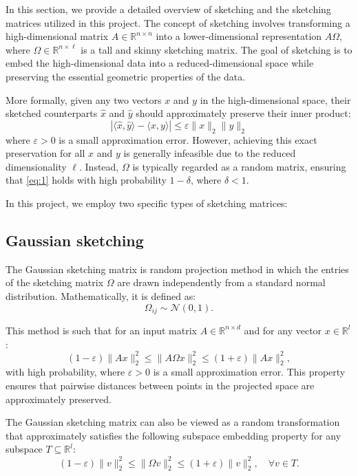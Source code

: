\documentclass[a4paper, 12pt,oneside]{article}
\begin{document}
In this section, we provide a detailed overview of sketching and the sketching matrices utilized in this project. The concept of sketching involves transforming a high-dimensional matrix $A \in \mathbb{R}^{n \times n}$ into a lower-dimensional representation $A\Omega$, where $\Omega \in \mathbb{R}^{n \times \ell}$ is a tall and skinny sketching matrix. The goal of sketching is to embed the high-dimensional data into a reduced-dimensional space while preserving the essential geometric properties of the data.

More formally, given any two vectors $x$ and $y$ in the high-dimensional space, their sketched counterparts $\hat{x}$ and $\hat{y}$ should approximately preserve their inner product:
\begin{equation}\label{eq:1}
\left| \langle \hat{x}, \hat{y} \rangle - \langle x, y \rangle \right| \leq \varepsilon \|x\|_2 \|y\|_2 \tag{2}
\end{equation}
where $\varepsilon > 0$ is a small approximation error. However, achieving this exact preservation for all $x$ and $y$ is generally infeasible due to the reduced dimensionality $\ell$. Instead, $\Omega$ is typically regarded as a random matrix, ensuring that \cref{eq:1} holds with high probability $1 - \delta$, where $\delta < 1$.

In this project, we employ two specific types of sketching matrices:
\subsection{Gaussian sketching }
The Gaussian sketching matrix is random projection method in which the entries of the sketching matrix $\Omega$ are drawn independently from a standard normal distribution. Mathematically, it is defined as:
\[
\Omega_{ij} \sim \mathcal{N}(0, 1).
\]

This method is such that for an input matrix $A \in \mathbb{R}^{n \times d}$ and for any vector $x \in \mathbb{R}^l$:
\[
(1 - \varepsilon)\|A x\|_2^2 \leq \|A \Omega x\|_2^2 \leq (1 + \varepsilon)\|A x\|_2^2,
\]
with high probability, where $\varepsilon > 0$ is a small approximation error. This property ensures that pairwise distances between points in the projected space are approximately preserved.

The Gaussian sketching matrix can also be viewed as a random transformation that approximately satisfies the following subspace embedding property for any subspace $T \subseteq \mathbb{R}^l$:
\[
(1 - \varepsilon) \|v\|_2^2 \leq \|\Omega v\|_2^2 \leq (1 + \varepsilon) \|v\|_2^2, \quad \forall v \in T.
\]
\end{document}

